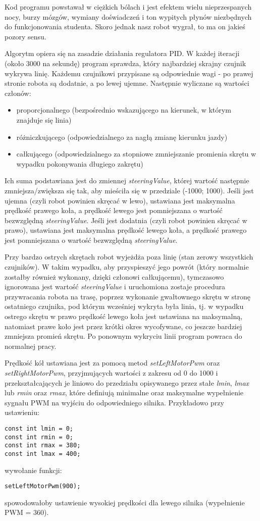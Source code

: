 Kod programu powstawał w ciężkich bólach i jest efektem wielu nieprzespanych nocy, burzy mózgów, wymiany doświadczeń i ton wypitych płynów niezbędnych do funkcjonowania studenta. Skoro jednak nasz robot wygrał, to ma on jakieś pozory sensu.

Algorytm opiera się na zasadzie działania regulatora PID. W każdej iteracji (około 3000 na sekundę) program sprawdza, który najbardziej skrajny czujnik wykrywa linię. Każdemu czujnikowi przypisane są odpowiednie wagi - po prawej stronie robota są dodatnie, a po lewej ujemne.
Następnie wyliczane są wartości członów: 
\begin{itemize}
\item proporcjonalnego (bezpośrednio wskazującego na kierunek, w którym znajduje się linia)
\item różniczkującego (odpowiedzialnego za nagłą zmianę kierunku jazdy)
\item całkującego (odpowiedzialnego za stopniowe zmniejszanie promienia skrętu w wypadku pokonywania długiego zakrętu)
\end{itemize}

Ich suma podstawiana jest do zmiennej \emph{steeringValue},  której wartość następnie zmniejsza/zwiększa się tak, aby mieściła się w przedziale (-1000; 1000).
Jeśli jest ujemna (czyli robot powinien skręcać w lewo), ustawiana jest maksymalna prędkość prawego koła, a prędkość lewego jest pomniejszana o wartość bezwzględną \emph{steeringValue}. 
Jeśli jest dodatnia (czyli robot powinien skręcać w prawo), ustawiana jest maksymalna prędkość lewego koła, a prędkość prawego jest pomniejszana o wartość bezwzględną \emph{steeringValue}.

Przy bardzo ostrych skrętach robot wyjeżdża poza linię (stan zerowy wszystkich czujników). W takim wypadku, aby przyspieszyć jego powrót (który normalnie zostałby również wykonany, dzięki członowi całkującemu), tymczasowo ignorowana jest wartość \emph{steeringValue} i uruchomiona zostaje procedura przywracania robota na trasę, poprzez wykonanie gwałtownego skrętu w stronę ostatniego czujnika, pod którym wcześniej wykryta była linia, tj. w wypadku ostrego skrętu w prawo prędkość lewego koła jest ustawiana na maksymalną, natomiast prawe koło jest przez krótki okres wycofywane, co jeszcze bardziej zmniejsza promień skrętu. Po ponownym wykryciu linii program powraca do normalnej pracy.

Prędkość kół ustawiana jest za pomocą metod \emph{setLeftMotorPwm} oraz \emph{setRightMotorPwm}, przyjmujących wartości z zakresu od 0 do 1000 i przekształcających je liniowo do przedziału opisywanego przez stałe \emph{lmin}, \emph{lmax} lub \emph{rmin} oraz \emph{rmax}, które definiują minimalne oraz maksymalne wypełnienie sygnału PWM na wyjściu do odpowiedniego silnika. Przykładowo przy ustawieniu:

\begin{lstlisting}
const int lmin = 0;
const int rmin = 0;
const int rmax = 380;
const int lmax = 400;
\end{lstlisting}
wywołanie funkcji:
\begin{lstlisting}
setLeftMotorPwm(900);
\end{lstlisting}
spowodowałoby ustawienie wysokiej prędkości dla lewego silnika (wypełnienie PWM = 360).
